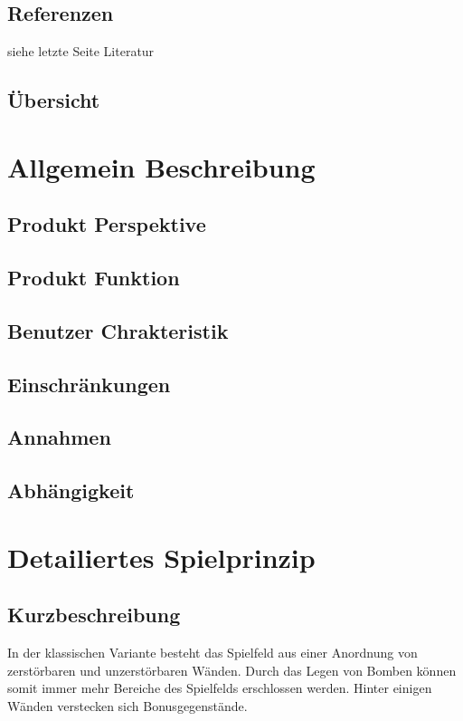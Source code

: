 \documentclass[11pt]{scrartcl}
\begin{document}
\subsection{Referenzen}
\label{sec:Referenzen}
siehe letzte Seite Literatur

\subsection{Übersicht}
\label{sec:Übersicht}

\section{Allgemein Beschreibung}
\label{sec:Allgemeine Beschreibung}

\subsection{Produkt Perspektive}
\label{sec:Produkt Perspektive}

\subsection{Produkt Funktion}
\label{sec:Produkt Funktion}

\subsection{Benutzer Chrakteristik}
\label{sec:Benutzer Chrakteristik}

\subsection{Einschränkungen}
\label{sec:Einschränkungen}

\subsection{Annahmen}
\label{sec:Annahmen}

\subsection{Abhängigkeit}
\label{sec:Abhängigkeit}
\newpage
\section{Detailiertes Spielprinzip}
\label{sec:Detailiertes Spielprinzip}
\subsection{Kurzbeschreibung}
\label{Kurzbeschreibung}
In der klassischen Variante besteht das Spielfeld aus einer Anordnung 
von zerstörbaren und unzerstörbaren Wänden. 
Durch das Legen von Bomben können somit immer mehr 
Bereiche des Spielfelds erschlossen werden. Hinter einigen 
Wänden verstecken sich Bonusgegenstände.\cite{Bomberman Spielprinzip}
\end{document}
